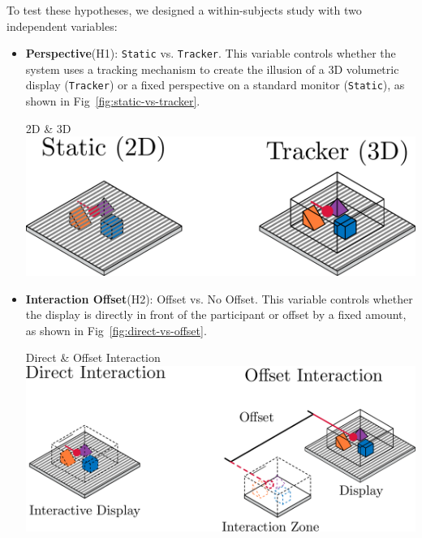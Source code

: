 To test these hypotheses, we designed a within-subjects study with two independent variables:
\begin{itemize}[itemsep=-0.25em]
    \item \textbf{Perspective}(H1): \texttt{Static} vs. \texttt{Tracker}. This variable controls whether the system uses a tracking mechanism to create the illusion of a 3D volumetric display (\texttt{Tracker}) or a fixed perspective on a standard monitor (\texttt{Static}), as shown in Fig~\ref{fig:static-vs-tracker}.

    \begin{figureBox}[label={fig:static-vs-tracker}, width=0.65\linewidth]{2D \& 3D}
        \includegraphics[width=0.9\linewidth]{./implementation/figures/2D-vs-3D.pdf}
    \end{figureBox}

    \item \textbf{Interaction Offset}(H2): Offset vs. No Offset. This variable controls whether the display is directly in front of the participant or offset by a fixed amount, as shown in Fig~\ref{fig:direct-vs-offset}.

    \begin{figureBox}[label={fig:direct-vs-offset}, width=0.65\linewidth]{Direct \& Offset Interaction}
        \includegraphics[width=0.9\linewidth]{./implementation/figures/direct-vs-offset.pdf}
    \end{figureBox}
\end{itemize}

